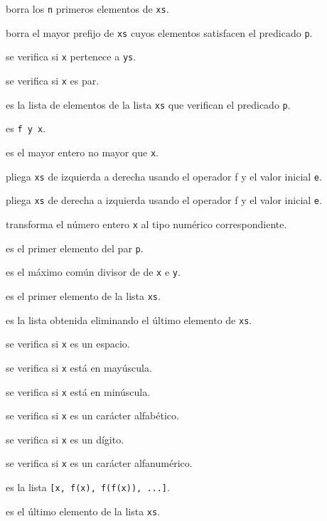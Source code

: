 \begin{enumerate*}
\item {} borra los \verb|n| primeros elementos de \verb|xs|.
\item {} borra el mayor prefijo de \verb|xs| cuyos
  elementos satisfacen el predicado \verb|p|.
\item {} se verifica si \verb|x| pertenece a \verb|ys|.
\item {} se verifica si \verb|x| es par.
\item {} es la lista de elementos de la lista \verb|xs| que
  verifican el predicado \verb|p|.
\item {} es \verb|f y x|.
\item {} es el mayor entero no mayor que \verb|x|.
\item {} pliega \verb|xs| de izquierda a derecha
  usando el operador f y el valor inicial \verb|e|.
\item {} pliega \verb|xs| de derecha a izquierda
  usando el operador f y el valor inicial \verb|e|.
\item {} transforma el número entero \verb|x| al tipo
  numérico correspondiente.
\item {} es el primer elemento del par \verb|p|.
\item {} es el máximo común divisor de de \verb|x| e \verb|y|.
\item {} es el primer elemento de la lista \verb|xs|.
\item {} es la lista obtenida eliminando el último elemento de
  \verb|xs|.
\item {}    se verifica si \verb|x| es un espacio.
\item {}    se verifica si \verb|x| está en mayúscula.
\item {}    se verifica si \verb|x| está en minúscula.
\item {}    se verifica si \verb|x| es un carácter alfabético.
\item {}    se verifica si \verb|x| es un dígito.
\item {} se verifica si \verb|x| es un carácter alfanumérico.
\item {} es la lista \verb|[x, f(x), f(f(x)), ...]|.
\item {} es el último elemento de la lista \verb|xs|.

\end{enumerate*}

